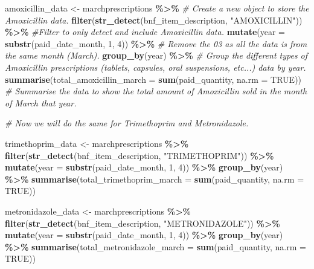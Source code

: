 \documentclass[
]{article}
\newenvironment{Shaded}{\begin{snugshade}}{\end{snugshade}}
\newcommand{\AttributeTok}[1]{\textcolor[rgb]{0.13,0.29,0.53}{#1}}
\newcommand{\CommentTok}[1]{\textcolor[rgb]{0.56,0.35,0.01}{\textit{#1}}}
\newcommand{\ConstantTok}[1]{\textcolor[rgb]{0.56,0.35,0.01}{#1}}
\newcommand{\DecValTok}[1]{\textcolor[rgb]{0.00,0.00,0.81}{#1}}
\newcommand{\FunctionTok}[1]{\textcolor[rgb]{0.13,0.29,0.53}{\textbf{#1}}}
\newcommand{\NormalTok}[1]{#1}
\newcommand{\OtherTok}[1]{\textcolor[rgb]{0.56,0.35,0.01}{#1}}
\newcommand{\SpecialCharTok}[1]{\textcolor[rgb]{0.81,0.36,0.00}{\textbf{#1}}}
\newcommand{\StringTok}[1]{\textcolor[rgb]{0.31,0.60,0.02}{#1}}
\begin{document}
\begin{Shaded}
\begin{Highlighting}[]
\NormalTok{amoxicillin\_data }\OtherTok{\textless{}{-}}\NormalTok{ marchprescriptions }\SpecialCharTok{\%\textgreater{}\%} \CommentTok{\# Create a new object to store the Amoxicillin data.}
  \FunctionTok{filter}\NormalTok{(}\FunctionTok{str\_detect}\NormalTok{(bnf\_item\_description, }\StringTok{"AMOXICILLIN"}\NormalTok{)) }\SpecialCharTok{\%\textgreater{}\%} \CommentTok{\#Filter to only detect and include Amoxicillin data.}
  \FunctionTok{mutate}\NormalTok{(}\AttributeTok{year =} \FunctionTok{substr}\NormalTok{(paid\_date\_month, }\DecValTok{1}\NormalTok{, }\DecValTok{4}\NormalTok{)) }\SpecialCharTok{\%\textgreater{}\%} \CommentTok{\# Remove the \textquotesingle{}03\textquotesingle{} as all the data is from the same month (March).}
  \FunctionTok{group\_by}\NormalTok{(year) }\SpecialCharTok{\%\textgreater{}\%} \CommentTok{\# Group the different types of Amoxicillin prescriptions (tablets, capsules, oral suspensions, etc...) data by year.}
  \FunctionTok{summarise}\NormalTok{(}\AttributeTok{total\_amoxicillin\_march =} \FunctionTok{sum}\NormalTok{(paid\_quantity, }\AttributeTok{na.rm =} \ConstantTok{TRUE}\NormalTok{)) }\CommentTok{\# Summarise the data to show the total amount of Amoxicillin sold in the month of March that year.}

\CommentTok{\# Now we will do the same for Trimethoprim and Metronidazole.}

\NormalTok{trimethoprim\_data }\OtherTok{\textless{}{-}}\NormalTok{ marchprescriptions }\SpecialCharTok{\%\textgreater{}\%} 
  \FunctionTok{filter}\NormalTok{(}\FunctionTok{str\_detect}\NormalTok{(bnf\_item\_description, }\StringTok{"TRIMETHOPRIM"}\NormalTok{)) }\SpecialCharTok{\%\textgreater{}\%} 
  \FunctionTok{mutate}\NormalTok{(}\AttributeTok{year =} \FunctionTok{substr}\NormalTok{(paid\_date\_month, }\DecValTok{1}\NormalTok{, }\DecValTok{4}\NormalTok{)) }\SpecialCharTok{\%\textgreater{}\%}
  \FunctionTok{group\_by}\NormalTok{(year) }\SpecialCharTok{\%\textgreater{}\%} 
  \FunctionTok{summarise}\NormalTok{(}\AttributeTok{total\_trimethoprim\_march =} \FunctionTok{sum}\NormalTok{(paid\_quantity, }\AttributeTok{na.rm =} \ConstantTok{TRUE}\NormalTok{))}

\NormalTok{metronidazole\_data }\OtherTok{\textless{}{-}}\NormalTok{ marchprescriptions }\SpecialCharTok{\%\textgreater{}\%} 
  \FunctionTok{filter}\NormalTok{(}\FunctionTok{str\_detect}\NormalTok{(bnf\_item\_description, }\StringTok{"METRONIDAZOLE"}\NormalTok{)) }\SpecialCharTok{\%\textgreater{}\%} 
  \FunctionTok{mutate}\NormalTok{(}\AttributeTok{year =} \FunctionTok{substr}\NormalTok{(paid\_date\_month, }\DecValTok{1}\NormalTok{, }\DecValTok{4}\NormalTok{)) }\SpecialCharTok{\%\textgreater{}\%}
  \FunctionTok{group\_by}\NormalTok{(year) }\SpecialCharTok{\%\textgreater{}\%} 
  \FunctionTok{summarise}\NormalTok{(}\AttributeTok{total\_metronidazole\_march =} \FunctionTok{sum}\NormalTok{(paid\_quantity, }\AttributeTok{na.rm =} \ConstantTok{TRUE}\NormalTok{))}


\end{Highlighting}
\end{Shaded}
\end{document}
